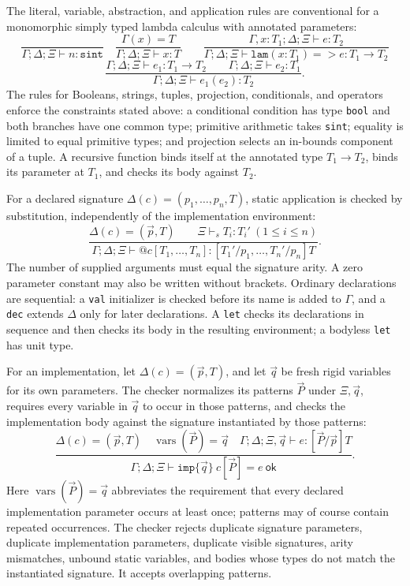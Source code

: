 \documentclass[11pt]{article}
\begin{document}
The literal, variable, abstraction, and application rules are conventional
for a monomorphic simply typed lambda calculus with annotated parameters:
\[
\frac{}{\Gamma;\Delta;\Xi\vdash n:\texttt{sint}}
\quad
\frac{\Gamma(x)=T}{\Gamma;\Delta;\Xi\vdash x:T}
\qquad
\frac{\Gamma,x:T_1;\Delta;\Xi\vdash e:T_2}
     {\Gamma;\Delta;\Xi\vdash\texttt{lam}(x:T_1)=>e:T_1\to T_2}
\]
\[
\frac{\Gamma;\Delta;\Xi\vdash e_1:T_1\to T_2
      \qquad \Gamma;\Delta;\Xi\vdash e_2:T_1}
     {\Gamma;\Delta;\Xi\vdash e_1(e_2):T_2}.
\]
The rules for Booleans, strings, tuples, projection, conditionals, and
operators enforce the constraints stated above: a conditional condition has
type \texttt{bool} and both branches have one common type; primitive
arithmetic takes \texttt{sint}; equality is limited to equal primitive
types; and projection selects an in-bounds component of a tuple. A recursive
function binds itself at the annotated type \(T_1\to T_2\), binds its
parameter at \(T_1\), and checks its body against \(T_2\).

For a declared signature \(\Delta(c)=(p_1,\ldots,p_n,T)\), static
application is checked by substitution, independently of the implementation
environment:
\[
\frac{\Delta(c)=(\vec p,T)
      \qquad \Xi\vdash_s T_i:T_i'\ (1\leq i\leq n)}
     {\Gamma;\Delta;\Xi\vdash \texttt{@}c[T_1,\ldots,T_n]:
       [T_1'/p_1,\ldots,T_n'/p_n]T}.
\]
The number of supplied arguments must equal the signature arity. A zero
parameter constant may also be written without brackets. Ordinary declarations
are sequential: a \texttt{val} initializer is checked before its name is
added to \(\Gamma\), and a \texttt{dec} extends \(\Delta\) only for later
declarations. A \texttt{let} checks its declarations in sequence and then
checks its body in the resulting environment; a bodyless \texttt{let} has
unit type.

For an implementation, let \(\Delta(c)=(\vec p,T)\), and let \(\vec q\)
be fresh rigid variables for its own parameters. The checker normalizes its
patterns \(\vec P\) under \(\Xi,\vec q\), requires every variable in
\(\vec q\) to occur in those patterns, and checks the implementation body
against the signature instantiated by those patterns:
\[
\frac{\Delta(c)=(\vec p,T)\quad
      \operatorname{vars}(\vec P)=\vec q\quad
      \Gamma;\Delta;\Xi,\vec q\vdash e:[\vec P/\vec p]T}
     {\Gamma;\Delta;\Xi\vdash
       \texttt{imp}\{\vec q\}\ c[\vec P]=e\ \mathsf{ok}}.
\]
Here \(\operatorname{vars}(\vec P)=\vec q\) abbreviates the requirement
that every declared implementation parameter occurs at least once; patterns
may of course contain repeated occurrences. The checker rejects duplicate
signature parameters, duplicate implementation parameters, duplicate visible
signatures, arity mismatches, unbound static variables, and bodies whose types
do not match the instantiated signature. It accepts overlapping patterns.
\end{document}
